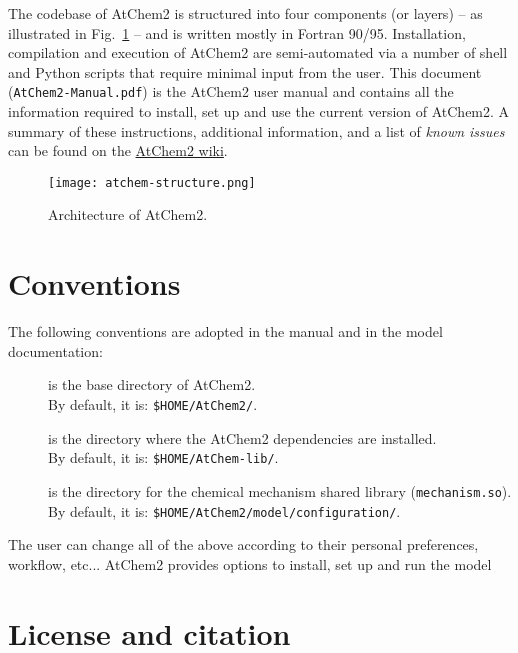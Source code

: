 The codebase of AtChem2 is structured into four components (or layers)
-- as illustrated in Fig.~\ref{fig:atchem-arch} -- and is written
mostly in Fortran 90/95. Installation, compilation and execution of
AtChem2 are semi-automated via a number of shell and Python scripts
that require minimal input from the user. This document
(\texttt{AtChem2-Manual.pdf}) is the AtChem2 user manual and contains
all the information required to install, set up and use the current
version of AtChem2. A summary of these instructions, additional
information, and a list of \emph{known issues} can be found on the
\href{https://github.com/AtChem/AtChem2/wiki}{AtChem2 wiki}.

\begin{figure}[htb]
  \centering
  \texttt{[image: atchem-structure.png]}
  \caption{Architecture of AtChem2.}
  \label{fig:atchem-arch}
\end{figure}

\section{Conventions} \label{sec:conventions}

The following conventions are adopted in the manual and in the model
documentation:

\begin{description}
\item[\maindir] is the base directory of AtChem2.\\
  By default, it is: \texttt{\$HOME/AtChem2/}.
\item[\depdir] is the directory where the AtChem2 dependencies are installed.\\
  By default, it is: \texttt{\$HOME/AtChem-lib/}.
\item[\sharedir] is the directory for the chemical mechanism shared
  library (\texttt{mechanism.so}).\\
  By default, it is: \texttt{\$HOME/AtChem2/model/configuration/}.
\end{description}

The user can change all of the above according to their personal
preferences, workflow, etc... AtChem2 provides options to install, set
up and run the model

\section{License and citation} \label{sec:license-citation}

